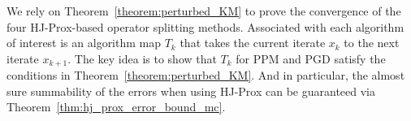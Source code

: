 \documentclass{article}
\newcommand{\sampledhjprox}{\operatorname{\widehat{prox}}^{\delta}}
\newcommand{\prox}{\operatorname{prox}}
\newcommand{\hjprox}{\operatorname{prox}^{\delta}}
\newcommand{\amp}{\mathop{\:\:\,}\nolimits}
\theoremstyle{plain}
\theoremstyle{definition}
\theoremstyle{remark}
\begin{document}
\newcommand{\bclemma}[1]{
At iteration $k$, let $\sampledhjprox_{t f}(x)$ denote the estimator of $\prox_{t f}(x)$ using $N_k$ samples drawn from $\mathcal{N}(x, \delta_k t I)$. Define the per-iteration approximation error
\begin{eqnarray}
e_k(x) &=& \hjprox_{t f}(x) - \prox_{t f}(x).
\end{eqnarray}
Let $\alpha_k \in (0,1)$ and let $b_k$ denote the high-probability bound from Theorem~\ref{thm:hj_prox_error_bound_mc},
\begin{eqnarray}
b_k &=& \sqrt{\frac{8 J_\star M_\star}{\alpha_k N_k}} + \sqrt{n t \delta_k}.
\end{eqnarray}
If the parameters $(\delta_k, N_k, \alpha_k)$ satisfy
\begin{eqnarray}
\sum_{k=0}^\infty \alpha_k < \infty &\text{and}& \sum_{k=0}^\infty b_k < \infty,
\end{eqnarray}
then the errors along the algorithmic iterates generated by $x_{k+1} = T_k(x_k)$ are summable almost surely:
\begin{eqnarray}
\sum_{k=0}^\infty \|e_k(x_k)\| &<& \infty \amp \text{almost surely}.
\end{eqnarray}
}

We rely on Theorem~\ref{theorem:perturbed_KM} to prove the convergence of the four HJ-Prox-based operator splitting methods. 
Associated with each algorithm of interest is an algorithm map $T_k$ that takes the current iterate $x_k$ to the next iterate $x_{k+1}$. The key idea is to show that $T_k$ for PPM and PGD satisfy the conditions in  Theorem~\ref{theorem:perturbed_KM}. And in particular, the almost sure summability of the errors when using HJ-Prox can be guaranteed via Theorem~\ref{thm:hj_prox_error_bound_mc}.
\end{document}
